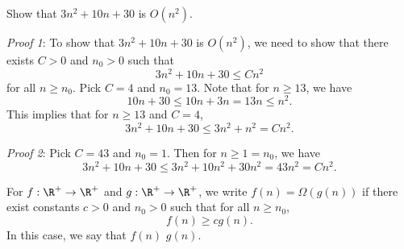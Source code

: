 \begin{flex}
\begin{exercise}  \label{exercise:Practice-with-big-O}
Show that $3n^2 + 10n + 30$ is $O(n^2)$.
\end{exercise}

\begin{solution}
\emph{Proof 1}: To show that $3n^2 + 10n + 30$ is $O(n^2)$, we need to show that there exists $C > 0$ and $n_0 > 0$ such that 
\[
3n^2 + 10n + 30 \leq Cn^2
\] 
for all $n \geq n_0$. Pick $C = 4$ and $n_0 = 13$. Note that for $n \geq 13$, we have
\[
10n + 30 \leq 10n + 3n = 13n \leq n^2.
\]
This implies that for $n \geq 13$ and $C = 4$,
\[
3n^2 + 10n + 30 \leq 3n^2 + n^2 = Cn^2. 
\]

\noindent
\emph{Proof 2}: Pick $C = 43$ and $n_0 = 1$. Then for $n \geq 1 = n_0$, we have
\[
3n^2 + 10n + 30 \leq 3n^2 + 10n^2 + 30n^2 = 43n^2 = Cn^2.
\]
\end{solution}
\end{flex}


\begin{definition} \label{definition:Big-Omega}
For $f: \R^+ \to \R^+$ and $g: \R^+ \to \R^+$, we write $f(n) = \Omega(g(n))$ if there exist constants $c > 0$ and $n_0 > 0$ such that for all $n \geq n_0$,
\[
f(n) \geq cg(n).
\]
In this case, we say that $f(n)$  $g(n)$.
\end{definition}


